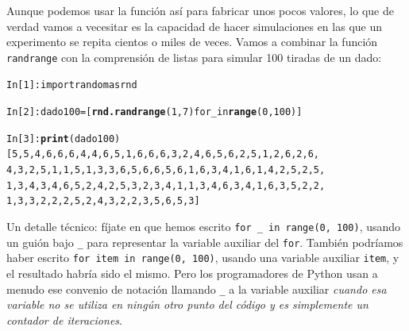 \documentclass[10pt,a4paper]{article}\usepackage[]{graphicx}\usepackage[]{color}
\makeatletter
\newcommand{\hlkwd}[1]{\textcolor[rgb]{0.737,0.353,0.396}{\textbf{#1}}}%
\newenvironment{kframe}{%
 \def\at@end@of@kframe{}%
 \ifinner\ifhmode%
  \def\at@end@of@kframe{\end{minipage}}%
  \begin{minipage}{\columnwidth}%
 \fi\fi%
 \def\FrameCommand##1{\hskip\@totalleftmargin \hskip-\fboxsep
 \colorbox{shadecolor}{##1}\hskip-\fboxsep
     \hskip-\linewidth \hskip-\@totalleftmargin \hskip\columnwidth}%
 \MakeFramed {\advance\hsize-\width
   \@totalleftmargin\z@ \linewidth\hsize
   \@setminipage}}%
 {\par\unskip\endMakeFramed%
 \at@end@of@kframe}
\newenvironment{knitrout}{}{} %
\newcounter {cont01}
\makeatother
\begin{document}
Aunque podemos usar la función así para fabricar unos pocos valores, lo que de verdad vamos a vecesitar es la capacidad de hacer simulaciones en las que un experimento se repita cientos o miles de veces. Vamos a combinar la función {\tt randrange} con la comprensión de listas para simular 100 tiradas de un dado:
\begin{knitrout}
\color{fgcolor}\begin{kframe}
\begin{alltt}
In [1]: import random as rnd

In [2]: dado100 = [\hlkwd{rnd.randrange}(1, 7) for _ in \hlkwd{range}(0, 100)]

In [3]: \hlkwd{print}(dado100)
[5, 5, 4, 6, 6, 6, 4, 4, 6, 5, 1, 6, 6, 6, 3, 2, 4, 6, 5, 6, 2, 5, 1, 2, 6, 2, 6,
4, 3, 2, 5, 1, 1, 5, 1, 3, 3, 6, 5, 6, 6, 5, 6, 1, 6, 3, 4, 1, 6, 1, 4, 2, 5, 2, 5,
1, 3, 4, 3, 4, 6, 5, 2, 4, 2, 5, 3, 2, 3, 4, 1, 1, 3, 4, 6, 3, 4, 1, 6, 3, 5, 2, 2,
1, 3, 3, 2, 2, 2, 5, 2, 4, 3, 2, 2, 3, 5, 6, 5, 3]
\end{alltt}
\end{kframe}
\end{knitrout}
Un detalle técnico: fíjate en que hemos escrito \verb&for _ in range(0, 100)&, usando un guión bajo \verb&_& para representar la variable auxiliar del {\tt for}. También podríamos haber escrito {\tt for item in range(0, 100)}, usando una variable auxiliar {\tt item}, y el resultado habría sido el mismo. Pero los programadores de Python usan a menudo ese convenio de notación llamando \verb&_& a la variable auxiliar {\em cuando esa variable no se utiliza en ningún otro punto del código y es simplemente un contador de iteraciones}.
\end{document}
